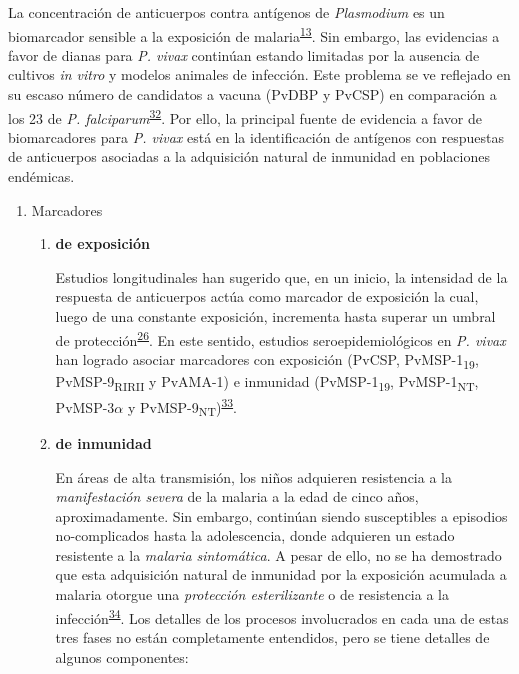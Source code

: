 \documentclass[a4paper]{article}
\begin{document}
La concentración de anticuerpos contra antígenos de \emph{Plasmodium} es
un biomarcador sensible a la exposición de
malaria\textsuperscript{\protect\hyperlink{ref-elliott2014}{13}}. Sin
embargo, las evidencias a favor de dianas para \emph{P. vivax} continúan
estando limitadas por la ausencia de cultivos \emph{in vitro} y modelos
animales de infección. Este problema se ve reflejado en su escaso número
de candidatos a vacuna (PvDBP y PvCSP) en comparación a los 23 de
\emph{P.
falciparum}\textsuperscript{\protect\hyperlink{ref-rainbow2016}{32}}.
Por ello, la principal fuente de evidencia a favor de biomarcadores para
\emph{P. vivax} está en la identificación de antígenos con respuestas de
anticuerpos asociadas a la adquisición natural de inmunidad en
poblaciones endémicas.

\begin{enumerate}
\def\labelenumi{\alph{enumi}.}
\item
  Marcadores

  \begin{enumerate}
  \def\labelenumii{\roman{enumii}.}
  \item
    \textbf{de exposición}

    Estudios longitudinales han sugerido que, en un inicio, la
    intensidad de la respuesta de anticuerpos actúa como marcador de
    exposición la cual, luego de una constante exposición, incrementa
    hasta superar un umbral de
    protección\textsuperscript{\protect\hyperlink{ref-Stanisic2015}{26}}.
    En este sentido, estudios seroepidemiológicos en \emph{P. vivax} han
    logrado asociar marcadores con exposición (PvCSP,
    PvMSP-1\textsubscript{19}, PvMSP-9\textsubscript{RIRII} y PvAMA-1) e
    inmunidad (PvMSP-1\textsubscript{19}, PvMSP-1\textsubscript{NT},
    PvMSP-3\(\alpha\) y
    PvMSP-9\textsubscript{NT})\textsuperscript{\protect\hyperlink{ref-cutts2014meta}{33}}.
  \item
    \textbf{de inmunidad}

    En áreas de alta transmisión, los niños adquieren resistencia a la
    \emph{manifestación severa} de la malaria a la edad de cinco años,
    aproximadamente. Sin embargo, continúan siendo susceptibles a
    episodios no-complicados hasta la adolescencia, donde adquieren un
    estado resistente a la \emph{malaria sintomática}. A pesar de ello,
    no se ha demostrado que esta adquisición natural de inmunidad por la
    exposición acumulada a malaria otorgue una \emph{protección
    esterilizante} o de resistencia a la
    infección\textsuperscript{\protect\hyperlink{ref-crompton2014rev}{34}}.
    Los detalles de los procesos involucrados en cada una de estas tres
    fases no están completamente entendidos, pero se tiene detalles de
    algunos componentes:


\end{enumerate}
\end{enumerate}
\end{document}
